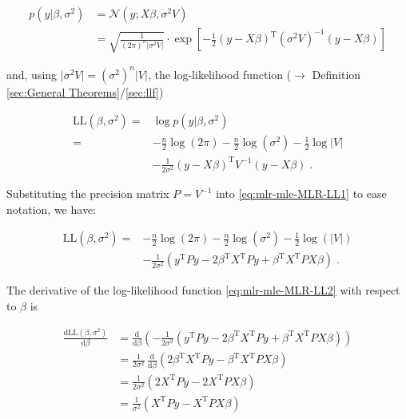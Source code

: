\documentclass[a4paper,12pt,twoside]{book}
\begin{document}
\begin{equation} \label{eq:mlr-mle-MLR-LF}
\begin{split}
p(y|\beta,\sigma^2) &= \mathcal{N}(y; X\beta, \sigma^2 V) \\
&= \sqrt{\frac{1}{(2\pi)^n |\sigma^2 V|}} \cdot \exp\left[ -\frac{1}{2} (y - X\beta)^\mathrm{T} (\sigma^2 V)^{-1} (y - X\beta) \right]
\end{split}
\end{equation}

and, using $\lvert \sigma^2 V \rvert = (\sigma^2)^n \lvert V \rvert$, the log-likelihood function ($\rightarrow$ Definition \ref{sec:General Theorems}/\ref{sec:llf})

\begin{equation} \label{eq:mlr-mle-MLR-LL1}
\begin{split}
\mathrm{LL}(\beta,\sigma^2) = &\log p(y|\beta,\sigma^2) \\
= &- \frac{n}{2} \log(2\pi) - \frac{n}{2} \log (\sigma^2) - \frac{1}{2} \log |V| \\
&- \frac{1}{2 \sigma^2} (y - X\beta)^\mathrm{T} V^{-1} (y - X\beta) \; .
\end{split}
\end{equation}

Substituting the precision matrix $P = V^{-1}$ into \eqref{eq:mlr-mle-MLR-LL1} to ease notation, we have:

\begin{equation} \label{eq:mlr-mle-MLR-LL2}
\begin{split}
\mathrm{LL}(\beta,\sigma^2) = &- \frac{n}{2} \log(2\pi) - \frac{n}{2} \log(\sigma^2) - \frac{1}{2} \log(|V|) \\
&- \frac{1}{2 \sigma^2} \left( y^\mathrm{T} P y - 2 \beta^\mathrm{T} X^\mathrm{T} P y + \beta^\mathrm{T} X^\mathrm{T} P X \beta \right) \; .
\end{split}
\end{equation}

\vspace{1em}
The derivative of the log-likelihood function \eqref{eq:mlr-mle-MLR-LL2} with respect to $\beta$ is

\begin{equation} \label{eq:mlr-mle-dLL-dbeta}
\begin{split}
\frac{\mathrm{d}\mathrm{LL}(\beta,\sigma^2)}{\mathrm{d}\beta} &= \frac{\mathrm{d}}{\mathrm{d}\beta} \left( - \frac{1}{2 \sigma^2} \left( y^\mathrm{T} P y - 2 \beta^\mathrm{T} X^\mathrm{T} P y + \beta^\mathrm{T} X^\mathrm{T} P X \beta \right) \right) \\
&= \frac{1}{2 \sigma^2} \, \frac{\mathrm{d}}{\mathrm{d}\beta} \left( 2 \beta^\mathrm{T} X^\mathrm{T} P y - \beta^\mathrm{T} X^\mathrm{T} P X \beta \right) \\
&= \frac{1}{2 \sigma^2} \left( 2 X^\mathrm{T} P y - 2 X^\mathrm{T} P X \beta \right) \\
&= \frac{1}{\sigma^2} \left( X^\mathrm{T} P y - X^\mathrm{T} P X \beta \right)
\end{split}
\end{equation}
\end{document}
